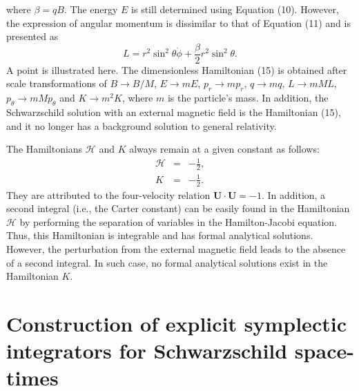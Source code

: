 \documentclass[preprint2]{aastex}
\begin{document}
where $\beta=qB$. The energy $E$ is still determined using
Equation (10). However, the expression of angular momentum is
dissimilar to that of Equation (11) and is presented as
\begin{equation}
L= r^{2}\sin^{2}\theta\dot{\phi}+\frac{\beta}{2}r^{2}\sin^{2}
\theta.
\end{equation}
A point is illustrated here. The dimensionless Hamiltonian (15) is
obtained after scale transformations of $B\rightarrow B/M$,
$E\rightarrow mE$, $p_r\rightarrow mp_r$, $q\rightarrow mq$,
$L\rightarrow mML$, $p_{\theta}\rightarrow mMp_{\theta}$ and
$K\rightarrow m^2K$, where $m$ is the particle's mass. In
addition, the Schwarzschild solution with an external magnetic
field is the Hamiltonian (15), and it no longer has a background
solution to general relativity.

The Hamiltonians $\mathcal{H}$ and $K$ always remain at a given
constant as follows:
\begin{eqnarray}
\mathcal{H} &=& -\frac{1}{2}, \\
K &=& -\frac{1}{2}.
\end{eqnarray}
They are attributed to the four-velocity relation
$\mathbf{U}\cdot\mathbf{U}=-1$. In addition, a second integral
(i.e., the Carter constant) can be easily found in the Hamiltonian
$\mathcal{H}$ by performing the separation of variables in the
Hamilton-Jacobi equation. Thus, this Hamiltonian is integrable and
has formal analytical solutions. However, the perturbation from
the external magnetic field leads to the absence of a second
integral. In such case, no formal analytical solutions exist in
the Hamiltonian $K$.

\section{Construction of explicit symplectic integrators for Schwarzschild space-times}
\end{document}
